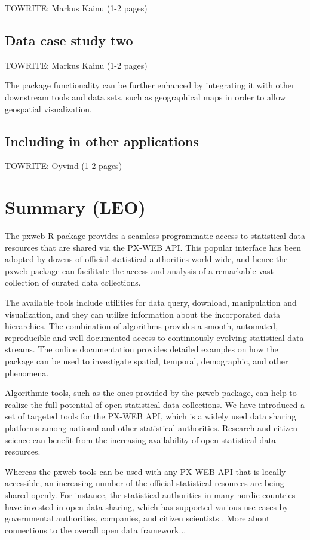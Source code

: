 \documentclass[article]{jss}
\begin{document}
TOWRITE: Markus Kainu (1-2 pages)

\subsection{Data case study two}

TOWRITE: Markus Kainu (1-2 pages)

The package functionality can be further enhanced by integrating it with other downstream tools and data sets, such as geographical maps in order to allow geospatial visualization.


\subsection{Including  in other applications}

TOWRITE: Oyvind (1-2 pages)

\section[summary]{Summary (LEO)}

The pxweb R package provides a seamless programmatic access to statistical data resources that are shared via the PX-WEB API. This popular interface has been adopted by dozens of official statistical authorities world-wide, and hence the pxweb package can facilitate the access and analysis of a remarkable vast collection of curated data collections. 

The available tools include utilities for data query, download, manipulation and visualization, and they can utilize information about the incorporated data hierarchies. The combination of algorithms provides a smooth, automated, reproducible and well-documented access to continuously evolving statistical data streams. The online documentation provides detailed examples on how the package can be used to investigate spatial, temporal, demographic, and other phenomena.

Algorithmic tools, such as the ones provided by the pxweb package, can help to realize the full potential of open statistical data collections. We have introduced a set of targeted tools for the PX-WEB API, which is a widely used data sharing platforms among national and other statistical authorities. Research and citizen science can benefit from the increasing availability of open statistical data resources. 

Whereas the pxweb tools can be used with any PX-WEB API that is locally accessible, an increasing number of the official statistical resources are being shared openly. For instance, the statistical authorities in many nordic countries have invested in open data sharing, which has supported various use cases by governmental authorities, companies, and citizen scientists \cite{xxx}. More about connections to the overall open data framework...
\end{document}
